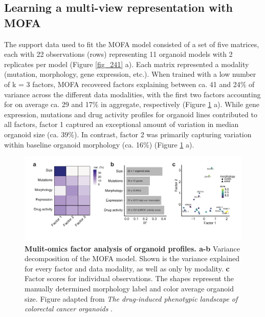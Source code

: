 \begin{flushleft}
\subsection{Learning a multi-view representation with MOFA}

The support data used to fit the MOFA model consisted of a set of five matrices, each with 22 observations (rows) representing 11 organoid models with 2 replicates per model (Figure \ref{fig_241} a). Each matrix represented a modality (mutation, morphology, gene expression, etc.). When trained with a low number of k = 3 factors, MOFA recovered factors explaining between ca. 41 and 24\% of variance across the different data modalities, with the first two factors accounting for on average ca. 29 and 17\% in aggregate, respectively (Figure \ref{fig_240} a). While gene expression, mutations and drug activity profiles for organoid lines contributed to all factors, factor 1 captured an exceptional amount of variation in median organoid size (ca. 39\%). In contrast, factor 2 was primarily capturing variation within baseline organoid morphology (ca. 16\%) (Figure \ref{fig_240} a).

\begin{figure}[!h]
\centering
\includegraphics[width=\textwidth,
                height=\textheight,
                keepaspectratio]{figures/promise/pdf/fig_4_0.pdf}
\caption[Mulit-omics factor analysis of organoid profiles]{\textbf{Mulit-omics factor analysis of organoid profiles. a-b} Variance decomposition of the MOFA model. Shown is the variance explained for every factor and data modality, as well as only by modality. \textbf{c} Factor scores for individual observations. The shapes represent the manually determined morphology label and color average organoid size. Figure adapted from \textit{The drug-induced phenotypic landscape of colorectal cancer organoids} \parencite{betgeDruginducedPhenotypicLandscape2022}.}
\label{fig_240}
\end{figure}
\bigbreak


\end{flushleft}
